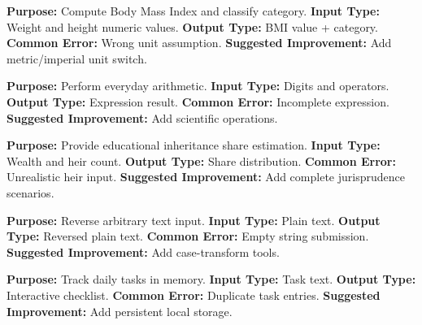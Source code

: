 \documentclass{article}
\begin{document}
\begin{featurebox}
\textbf{Purpose:} Compute Body Mass Index and classify category.\newline
\textbf{Input Type:} Weight and height numeric values.\newline
\textbf{Output Type:} BMI value + category.\newline
\textbf{Common Error:} Wrong unit assumption.\newline
\textbf{Suggested Improvement:} Add metric/imperial unit switch.
\end{featurebox}

\begin{featurebox}
\textbf{Purpose:} Perform everyday arithmetic.\newline
\textbf{Input Type:} Digits and operators.\newline
\textbf{Output Type:} Expression result.\newline
\textbf{Common Error:} Incomplete expression.\newline
\textbf{Suggested Improvement:} Add scientific operations.
\end{featurebox}

\begin{featurebox}
\textbf{Purpose:} Provide educational inheritance share estimation.\newline
\textbf{Input Type:} Wealth and heir count.\newline
\textbf{Output Type:} Share distribution.\newline
\textbf{Common Error:} Unrealistic heir input.\newline
\textbf{Suggested Improvement:} Add complete jurisprudence scenarios.
\end{featurebox}

\begin{featurebox}
\textbf{Purpose:} Reverse arbitrary text input.\newline
\textbf{Input Type:} Plain text.\newline
\textbf{Output Type:} Reversed plain text.\newline
\textbf{Common Error:} Empty string submission.\newline
\textbf{Suggested Improvement:} Add case-transform tools.
\end{featurebox}

\begin{featurebox}
\textbf{Purpose:} Track daily tasks in memory.\newline
\textbf{Input Type:} Task text.\newline
\textbf{Output Type:} Interactive checklist.\newline
\textbf{Common Error:} Duplicate task entries.\newline
\textbf{Suggested Improvement:} Add persistent local storage.
\end{featurebox}
\end{document}
